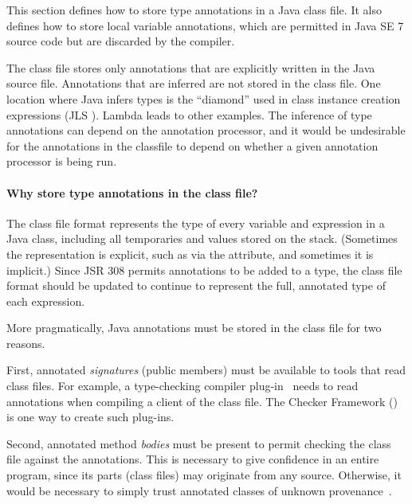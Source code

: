 \documentclass[10pt]{article}
\begin{document}
\newcommand{\extendedannotation}{\code{type\-\_anno\-ta\-tion}\xspace}


This section defines how to store type annotations in a Java class file.
It also defines how to store local variable annotations, which are
permitted in Java SE 7 source code but are discarded by the compiler.

The class file stores only annotations that are explicitly written in the
Java source file.  Annotations that are inferred are not stored in the
class file.  One location where Java infers types is the ``diamond'' used
in class instance creation expressions (JLS ).
Lambda leads to other examples.  The inference of type annotations can
depend on the annotation processor,
and it would be undesirable for the
annotations in the classfile to depend on whether a given annotation
processor is being run.


\paragraph{Why store type annotations in the class file?}

The class file format represents the type of every variable and expression
in a Java class, including all temporaries and values stored on the stack.
(Sometimes the representation is explicit, such as via the
 attribute, and sometimes it is implicit.)
Since JSR 308 permits annotations to be added to a type, the class file
format should be updated to continue to represent the full, annotated type
of each expression.


More pragmatically, Java annotations must be stored in the class file for two reasons.

First, annotated \emph{signatures} (public members) must be available to
tools that read class files.  For example, a type-checking compiler
plug-in~\cite{JSR269,PapiACPE2008} needs to read annotations when compiling
a client of the class file.  The Checker Framework
() is
one way to create such plug-ins.

Second, annotated method \emph{bodies} must be present to permit checking
the class file against the annotations.  This is necessary to give
confidence in an entire program, since its parts (class files) may
originate from any source.  Otherwise, it would be necessary to simply
trust annotated classes of unknown provenance~\cite{BurdyHP2007}.
\end{document}
